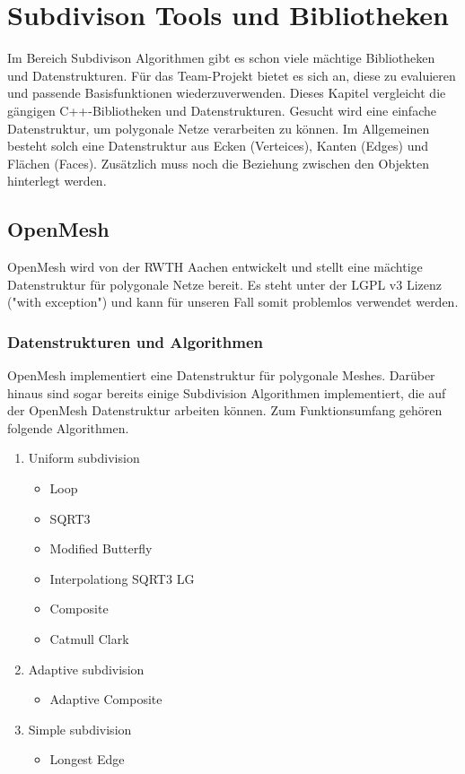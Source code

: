 \chapter{Subdivison Tools und Bibliotheken}

Im Bereich Subdivison Algorithmen gibt es schon viele mächtige Bibliotheken und Datenstrukturen.
Für das Team-Projekt bietet es sich an, diese zu evaluieren und passende Basisfunktionen wiederzuverwenden.
Dieses Kapitel vergleicht die gängigen C++-Bibliotheken und Datenstrukturen.
Gesucht wird eine einfache Datenstruktur, um polygonale Netze verarbeiten zu können.
Im Allgemeinen besteht solch eine Datenstruktur aus Ecken (Verteices), Kanten (Edges) und Flächen (Faces).
Zusätzlich muss noch die Beziehung zwischen den Objekten hinterlegt werden.


\section{OpenMesh}

OpenMesh wird von der \acs{RWTH} Aachen entwickelt und stellt eine mächtige Datenstruktur für polygonale Netze bereit.
Es steht unter der \acs{LGPL} v3 Lizenz ("with exception") und kann für unseren Fall somit problemlos verwendet werden.

\subsection{Datenstrukturen und Algorithmen}

OpenMesh implementiert eine Datenstruktur für polygonale Meshes. Darüber hinaus sind sogar bereits einige Subdivision Algorithmen implementiert, die auf der OpenMesh Datenstruktur arbeiten können. Zum Funktionsumfang gehören folgende Algorithmen.
\begin{enumerate}
\item Uniform subdivision
\begin{itemize}
	\item Loop
	\item SQRT3
	\item Modified Butterfly
	\item Interpolationg SQRT3 LG
	\item Composite
	\item Catmull Clark
\end{itemize}
\item Adaptive subdivision
\begin{itemize}
	\item Adaptive Composite
\end{itemize}
\item Simple subdivision
\begin{itemize}
	\item Longest Edge
\end{itemize}
\end{enumerate}

